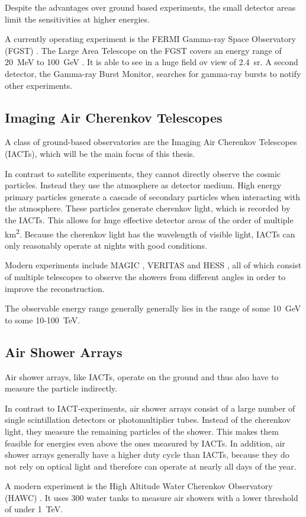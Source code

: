 Despite the advantages over ground based experiments, the small detector areas 
limit the sensitivities at higher energies.

A currently operating experiment is the FERMI Gamma-ray Space Observatory (FGST) \cite{Atwood_2009}.
The Large Area Telescope on 
the FGST covers an energy range of
\SI{20}{\mega\electronvolt} to \SI{100}{\giga\electronvolt} \cite{Atwood_2009}.
It is able to see in a huge field ov view of 
\SI{2.4}{\steradian}. A second detector, the Gamma-ray Burst Monitor,
searches for gamma-ray bursts to notify other experiments.

\subsection{Imaging Air Cherenkov Telescopes}
A class of ground-based observatories are the 
Imaging Air Cherenkov Telescopes (IACTs),
which will be the main focus of this thesis.

In contrast to satellite experiments, they cannot directly
observe the cosmic particles. Instead they use the atmosphere as detector medium.
High energy primary particles generate a cascade of secondary particles
when interacting with the atmosphere. These particles generate cherenkov
light, which is recorded by the IACTs.
This allows for huge effective detector areas of the order of
multiple \si{\square\kilo\meter}.
Because the cherenkov light has the wavelength of visible light,
IACTs can only reasonably operate at nights with good conditions.

Modern experiments include 
MAGIC \cite{ALEKSIC2012435},
VERITAS \cite{WEEKES2002221}
and HESS \cite{vincent2005hess},
all of which consist of multiple telescopes to observe the showers
from different angles in order to improve the reconstruction.

The observable energy range generally generally lies in the range of
some \SI{10}{\giga\electronvolt} to some 10-\SI{100}{\tera\electronvolt}.

\subsection{Air Shower Arrays}
Air shower arrays, like IACTs, operate on the ground and thus also have 
to measure the particle indirectly.

In contrast to IACT-experiments, air shower arrays consist of a large
number of single scintillation detectors or photomultiplier tubes.
Instead of the cherenkov light, they measure the
remaining particles of the shower. This makes them feasible
for energies even above the ones measured by IACTs.
In addition, air shower arrays generally have a higher duty cycle than
IACTs, because they do not rely on optical light and therefore can operate
at nearly all days of the year.

A modern experiment is the High Altitude Water Cherenkov Observatory (HAWC) \cite{2015ICRC...34..966S}.
It uses \num{300} water tanks to measure air showers with a lower threshold
of under \SI{1}{\tera\electronvolt}.
